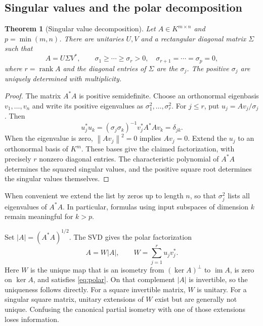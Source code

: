 \documentclass[11pt,a4paper]{article}
\numberwithin{equation}{section}
\newtheorem{theorem}{Theorem}[section]
\theoremstyle{definition}
\theoremstyle{remark}
\newcommand{\rank}{\operatorname{rank}}
\newcommand{\im}{\operatorname{im}}
\newcommand{\norm}[1]{\left\lVert#1\right\rVert}
\begin{document}
\subsection{Singular values and the polar decomposition}
\begin{theorem}[Singular value decomposition]\label{thm:svd}
Let $A\in K^{m\times n}$ and $p=\min(m,n)$. There are unitaries $U,V$ and
a rectangular diagonal matrix $\Sigma$ such that
\[
 A=U\Sigma V^*,\qquad
 \sigma_1\ge\cdots\ge\sigma_r>0,
 \quad \sigma_{r+1}=\cdots=\sigma_p=0,
\]
where $r=\rank A$ and the diagonal entries of $\Sigma$ are the $\sigma_j$.
The positive $\sigma_j$ are uniquely determined with multiplicity.
\end{theorem}
\begin{proof}
The matrix $A^*A$ is positive semidefinite. Choose an orthonormal eigenbasis
$v_1,\ldots,v_n$ and write its positive eigenvalues as
$\sigma_1^2,\ldots,\sigma_r^2$. For $j\le r$, put
$u_j=Av_j/\sigma_j$. Then
\[
 u_j^*u_k=(\sigma_j\sigma_k)^{-1}v_j^*A^*Av_k=\delta_{jk}.
\]
When the eigenvalue is zero, $\norm{Av_j}^2=0$ implies $Av_j=0$.
Extend the $u_j$ to an orthonormal basis of $K^m$. These bases give the
claimed factorization, with precisely $r$ nonzero diagonal entries. The
characteristic polynomial of $A^*A$ determines the squared singular values,
and the positive square root determines the singular values themselves.
\end{proof}

When convenient we extend the list by zeros up to length $n$, so that
$\sigma_j^2$ lists all eigenvalues of $A^*A$. In particular, formulas using
input subspaces of dimension $k$ remain meaningful for $k>p$.

Set $|A|=(A^*A)^{1/2}$. The SVD gives the polar factorization
\begin{equation}\label{eq:polar}
 A=W|A|,\qquad
 W=\sum_{j=1}^ru_jv_j^*.
\end{equation}
Here $W$ is the unique map that is an isometry from $(\ker A)^\perp$ to
$\im A$, is zero on $\ker A$, and satisfies \eqref{eq:polar}. On that
complement $|A|$ is invertible, so the uniqueness follows directly. For a
square invertible matrix, $W$ is unitary. For a singular square matrix,
unitary extensions of $W$ exist but are generally not unique. Confusing the
canonical partial isometry with one of those extensions loses information.
\end{document}
